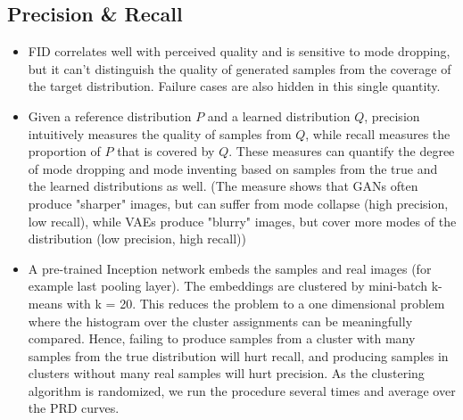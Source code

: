 \documentclass{article}
\begin{document}
\subsection{Precision \& Recall}
 \begin{itemize}
    \item FID correlates well with perceived quality and is sensitive to mode dropping, but it can't distinguish the quality of generated samples from the coverage of the target distribution. Failure cases are also hidden in this single quantity.
    \item Given a reference distribution $P$ and a learned distribution $Q$, precision intuitively measures the quality of samples from $Q$, while  recall measures the proportion of $P$ that is covered by $Q$. These measures can quantify the degree of mode dropping and mode inventing based on samples from the true and the learned distributions as well. (The measure shows that GANs often produce "sharper" images, but can suffer from mode collapse (high  precision, low recall), while VAEs produce "blurry" images, but cover more modes of the distribution  (low precision, high recall))
    \item A pre-trained Inception network embeds the samples and real images (for example last pooling layer). The embeddings are clustered by mini-batch k-means with k = 20. This reduces the problem to a one dimensional problem where the histogram over the cluster assignments can be meaningfully compared. Hence, failing to produce samples from a cluster with many samples from the true distribution will hurt recall, and producing  samples in clusters without many real samples will hurt precision. As the clustering algorithm is randomized, we run the procedure several times and average over the PRD curves.
\end{itemize}
\end{document}
